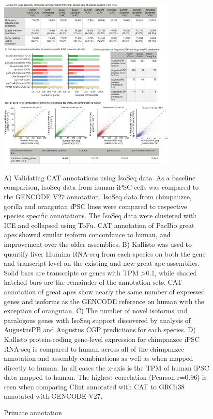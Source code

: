 \documentclass[fleqn,10pt]{wlscirep}
\begin{document}
\begin{figure}
\centering
\includegraphics[width=0.8\textwidth,height=0.8\textheight,keepaspectratio]{figure2-primate_v10.pdf}
\caption{Primate annotation}
A) Validating CAT annotations using IsoSeq data. As a baseline comparison, IsoSeq data from human iPSC cells was compared to the GENCODE V27 annotation. IsoSeq data from chimpanzee,  gorilla and orangutan iPSC lines were compared to respective species specific annotations.  The IsoSeq data were clustered with ICE and collapsed using ToFu\cite{gordon2015widespread}. CAT annotation of PacBio great apes showed similar isoform concordance to human, and improvement over the older assemblies. B) Kallisto\cite{bray2015near} was used to quantify liver Illumina RNA-seq from each species on both the gene and transcript level on the existing and new great ape assemblies. Solid bars are transcripts or genes with TPM \textgreater 0.1, while shaded hatched bars are the remainder of the annotation sets. CAT annotation of great apes show nearly the same number of expressed genes and isoforms as the GENCODE reference on human with the exception of orangutan. C) The number of novel isoforms and paralogous genes with IsoSeq support discovered by analysis of AugustusPB and Augustus CGP predictions for each species. D) Kallisto protein-coding gene-level expression for chimpanzee iPSC RNA-seq is compared to human across all of the chimpanzee annotation and assembly combinations as well as when mapped directly to human. In all cases the x-axis is the TPM of human iPSC data mapped to human. The highest correlation (Pearson r=0.96) is seen when comparing Clint annotated with CAT to GRCh38 annotated with GENCODE V27.
\label{fig:primate}
\end{figure}
\end{document}
